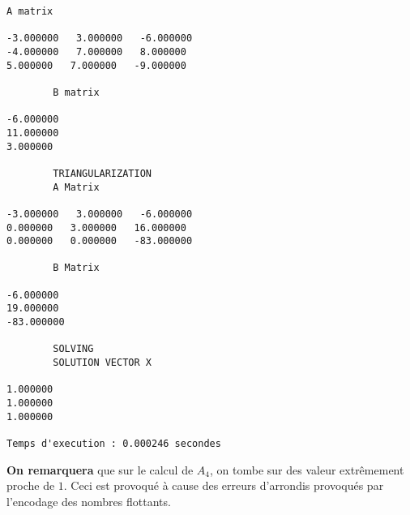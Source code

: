 \begin{lstlisting}[caption={$A_6X=B$} results, basicstyle=\fontsize{4}{6}\selectfont]
		A matrix 

-3.000000   3.000000   -6.000000   
-4.000000   7.000000   8.000000   
5.000000   7.000000   -9.000000   

		B matrix 

-6.000000   
11.000000   
3.000000   

		TRIANGULARIZATION 
		A Matrix 

-3.000000   3.000000   -6.000000   
0.000000   3.000000   16.000000   
0.000000   0.000000   -83.000000   

		B Matrix 

-6.000000   
19.000000   
-83.000000   

		SOLVING 
		SOLUTION VECTOR X 

1.000000   
1.000000   
1.000000   

Temps d'execution : 0.000246 secondes
\end{lstlisting}

\textbf{On remarquera} que sur le calcul de $A_4$, on tombe sur des valeur extrêmement proche de $1$. Ceci est provoqué à cause des erreurs d'arrondis provoqués par l'encodage des nombres flottants.     